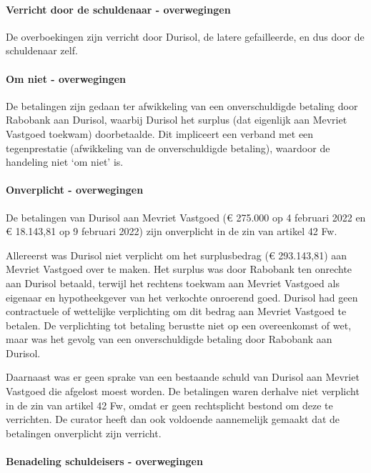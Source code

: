 \documentclass[
  dutch,
  a4paper,
]{article}
\begin{document}
\paragraph{Verricht door de schuldenaar - overwegingen}\label{verricht-door-de-schuldenaar---overwegingen-9}

De overboekingen zijn verricht door Durisol, de latere gefailleerde, en dus door de schuldenaar zelf.

\paragraph{Om niet - overwegingen}\label{om-niet---overwegingen-9}

De betalingen zijn gedaan ter afwikkeling van een onverschuldigde betaling door Rabobank aan Durisol, waarbij Durisol het surplus (dat eigenlijk aan Mevriet Vastgoed toekwam) doorbetaalde. Dit impliceert een verband met een tegenprestatie (afwikkeling van de onverschuldigde betaling), waardoor de handeling niet `om niet' is.

\paragraph{Onverplicht - overwegingen}\label{onverplicht---overwegingen-9}

De betalingen van Durisol aan Mevriet Vastgoed (€ 275.000 op 4 februari 2022 en € 18.143,81 op 9 februari 2022) zijn onverplicht in de zin van artikel 42 Fw.

Allereerst was Durisol niet verplicht om het surplusbedrag (€ 293.143,81) aan Mevriet Vastgoed over te maken. Het surplus was door Rabobank ten onrechte aan Durisol betaald, terwijl het rechtens toekwam aan Mevriet Vastgoed als eigenaar en hypotheekgever van het verkochte onroerend goed. Durisol had geen contractuele of wettelijke verplichting om dit bedrag aan Mevriet Vastgoed te betalen. De verplichting tot betaling berustte niet op een overeenkomst of wet, maar was het gevolg van een onverschuldigde betaling door Rabobank aan Durisol.

Daarnaast was er geen sprake van een bestaande schuld van Durisol aan Mevriet Vastgoed die afgelost moest worden. De betalingen waren derhalve niet verplicht in de zin van artikel 42 Fw, omdat er geen rechtsplicht bestond om deze te verrichten. De curator heeft dan ook voldoende aannemelijk gemaakt dat de betalingen onverplicht zijn verricht.

\paragraph{Benadeling schuldeisers - overwegingen}\label{benadeling-schuldeisers---overwegingen-9}
\end{document}
